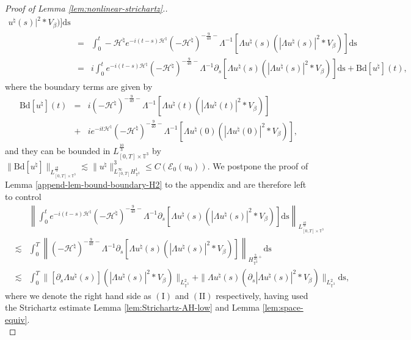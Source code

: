 \begin{proof}[Proof of Lemma \ref{lem:nonlinear-strichartz}.]
\begin{eqnarray*}
    u^{\natural} (s) |^2 \ast V_{\beta})] \mathrm{ds}\\
    & = & \int^t_0 - \mathcal{H}^{\natural} e^{- i (t - s)
    \mathcal{H}^{\natural}} (- \mathcal{H}^{\natural})^{- \frac{9}{40} -}
    \Lambda^{- 1} [\Lambda u^{\natural} (s) (| \Lambda u^{\natural} (s) |^2
    \ast V_{\beta})] \mathrm{ds}\\
    & = & i \int^t_0 e^{- i (t - s) \mathcal{H}^{\natural}} (-
    \mathcal{H}^{\natural})^{- \frac{9}{40} -} \Lambda^{- 1} \partial_s
    [\Lambda u^{\natural} (s) (| \Lambda u^{\natural} (s) |^2 \ast V_{\beta})]
    \mathrm{ds} + \mathrm{Bd} [u^{\natural}] (t),
  \end{eqnarray*}
  where the boundary terms are given by
  \begin{eqnarray*}
    \mathrm{Bd} [u^{\natural}] (t) & = & i (- \mathcal{H}^{\natural})^{-
    \frac{9}{40} -} \Lambda^{- 1} [\Lambda u^{\natural} (t) (| \Lambda
    u^{\natural} (t) |^2 \ast V_{\beta})]\\
    & + & i e^{- i t \mathcal{H}^{\natural}}  (- \mathcal{H}^{\natural})^{-
    \frac{9}{40} -} \Lambda^{- 1} [\Lambda u^{\natural} (0) (| \Lambda
    u^{\natural} (0) |^2 \ast V_{\beta})], \label{eq:bd-nonl-strichartz-H2}
  \end{eqnarray*}
  and they can be bounded in $L_{[0, T] \times \mathbb{T}^3}^{\frac{10}{3}}$
  by $\| \mathrm{Bd} [u^{\natural}] \|_{L_{[0, T] \times
  \mathbb{T}^3}^{\frac{10}{3}}} \lesssim \| u^{\natural} \|^3_{L_{[0,
  T]}^{\infty} H_{\mathbb{T}^3}^1} \leqslant C (\mathcal{E}_0 (u_0))$. We
  postpone the proof of Lemma \ref{append-lem-bound-boundary-H2} to the
  appendix and are therefore left to control
  \begin{eqnarray*}
    &  & \left\| \int^t_0 e^{- i (t - s) \mathcal{H}^{\natural}} (-
    \mathcal{H}^{\natural})^{- \frac{9}{40} -} \Lambda^{- 1} \partial_s
    [\Lambda u^{\natural} (s) (| \Lambda u^{\natural} (s) |^2 \ast V_{\beta})]
    \mathrm{ds} \right\|_{L_{[0, T] \times \mathbb{T}^3}^{\frac{10}{3}}}\\
    & \lesssim & \int^T_0 \left\| (- \mathcal{H}^{\natural})^{- \frac{9}{40}
    -} \Lambda^{- 1} \partial_s [\Lambda u^{\natural} (s) (| \Lambda
    u^{\natural} (s) |^2 \ast V_{\beta})]
    \right\|_{H_{\mathbb{T}^3}^{\frac{9}{20} +}} \mathrm{ds}\\
    & \lesssim & \int^T_0 \| [\partial_s \Lambda u^{\natural} (s)] (| \Lambda
    u^{\natural} (s) |^2 \ast V_{\beta}) \|_{L_{\mathbb{T}^3}^2} + \| \Lambda
    u^{\natural} (s) (\partial_s | \Lambda u^{\natural} (s) |^2 \ast
    V_{\beta}) \|_{L_{\mathbb{T}^3}^2} \mathrm{ds},
  \end{eqnarray*}
  where we denote the right hand side as $(\mathrm{I})$ and $(\mathrm{I} \mathrm{I})$ respectively, having used the Strichartz estimate Lemma \ref{lem:Strichartz-AH-low} and
  Lemma \ref{lem:space-equiv}.\\
  

\end{proof}
